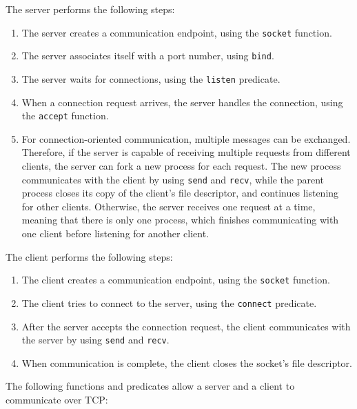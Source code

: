 The server performs the following steps:
\begin{enumerate}
\item The server creates a communication endpoint, using the \texttt{socket} function.
\item The server associates itself with a port number, using \texttt{bind}.
\item The server waits for connections, using the \texttt{listen} predicate.
\item When a connection request arrives, the server handles the connection, using the \texttt{accept} function. 
\item For connection-oriented communication, multiple messages can be exchanged.  Therefore, if the server is capable of receiving multiple requests from different clients, the server can fork a new process for each request.  The new process communicates with the client by using \texttt{send} and \texttt{recv}, while the parent process closes its copy of the client's file descriptor, and continues listening for other clients.  Otherwise, the server receives one request at a time, meaning that there is only one process, which finishes communicating with one client before listening for another client.
\end{enumerate}

The client performs the following steps:
\begin{enumerate}
\item The client creates a communication endpoint, using the \texttt{socket} function.
\item The client tries to connect to the server, using the \texttt{connect} predicate.
\item After the server accepts the connection request, the client communicates with the server by using \texttt{send} and \texttt{recv}.
\item When communication is complete, the client closes the socket's file descriptor.
\end{enumerate}

The following functions and predicates allow a server and a client to communicate over TCP:

